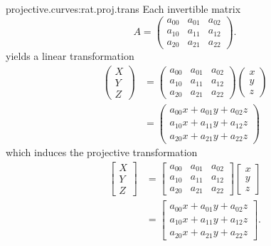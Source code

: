 \begin{answer}{projective.curves:rat.proj.trans}
Each invertible matrix
\[
A=
\begin{pmatrix}
a_{00} & a_{01} & a_{02} \\
a_{10} & a_{11} & a_{12} \\
a_{20} & a_{21} & a_{22}
\end{pmatrix}.
\]
yields a linear transformation
\begin{align*}
\begin{pmatrix}
X\\
Y\\
Z
\end{pmatrix}
&=
\begin{pmatrix}
a_{00} & a_{01} & a_{02} \\
a_{10} & a_{11} & a_{12} \\
a_{20} & a_{21} & a_{22}
\end{pmatrix}
\begin{pmatrix}
x\\
y\\
z
\end{pmatrix}\\
&=
\begin{pmatrix}
a_{00}x+a_{01}y+a_{02}z \\
a_{10}x+a_{11}y+a_{12}z \\
a_{20}x+a_{21}y+a_{22}z
\end{pmatrix}
\end{align*}
which induces the projective transformation
\begin{align*}
\begin{bmatrix}
X\\
Y\\
Z
\end{bmatrix}
&=
\begin{bmatrix}
a_{00} & a_{01} & a_{02} \\
a_{10} & a_{11} & a_{12} \\
a_{20} & a_{21} & a_{22}
\end{bmatrix}
\begin{bmatrix}
x\\
y\\
z
\end{bmatrix}
\\
&=
\begin{bmatrix}
a_{00}x+a_{01}y+a_{02}z \\
a_{10}x+a_{11}y+a_{12}z \\
a_{20}x+a_{21}y+a_{22}z
\end{bmatrix}.

\end{align*}
\end{answer}
